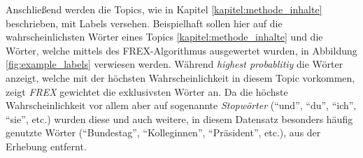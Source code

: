 \documentclass[12pt, 
    twoside=false, 
    bibliography=totoc, 
    numbers=endperiod, 
    headings=normal, 
    toc=chapterentrydotfill
    ]{scrbook}
\begin{document}
Anschließend werden die Topics, wie in Kapitel \ref{kapitel:methode_inhalte} beschrieben, mit Labels versehen. Beispielhaft sollen hier auf die wahrscheinlichsten Wörter eines Topics \ref{kapitel:methode_inhalte} und die Wörter, welche mittels des FREX-Algorithmus ausgewertet wurden, in Abbildung \ref{fig:example_labels} verwiesen werden. Während \emph{highest probablitiy} die Wörter anzeigt, welche mit der höchsten Wahrscheinlichkeit in diesem Topic vorkommen, zeigt \emph{FREX} gewichtet die exklusivsten Wörter an. Da die höchste Wahrscheinlichkeit vor allem aber auf sogenannte \emph{Stopwörter} (\enquote{und}, \enquote{du}, \enquote{ich}, \enquote{sie}, etc.) wurden diese und auch weitere, in diesem Datensatz besonders häufig genutzte Wörter (\enquote{Bundestag}, \enquote{Kolleginnen}, \enquote{Präsident}, etc.), aus der Erhebung entfernt.
\end{document}
